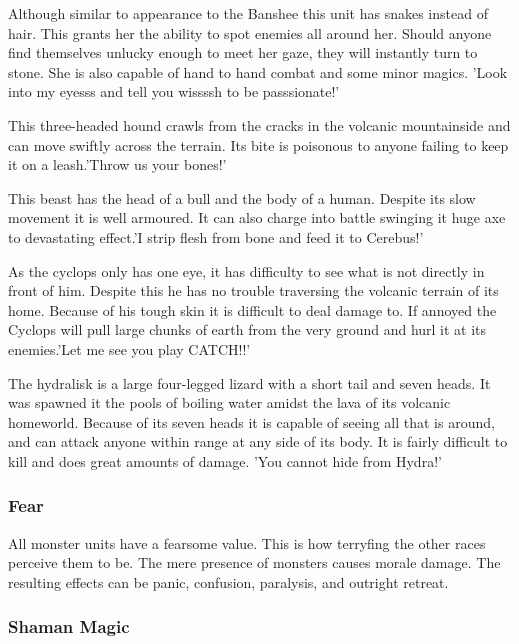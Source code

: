\documentclass[a4paper,twocolumn]{article}
\begin{document}
Although similar to appearance to the Banshee this unit has snakes instead of hair. This grants her the ability to spot enemies all around her. Should anyone find themselves unlucky enough to meet her gaze, they will instantly turn to stone. She is also capable of hand to hand combat and some minor magics. 'Look into my eyesss and tell you wissssh to be passsionate!'

This three-headed hound crawls from the cracks in the volcanic mountainside and can move swiftly across the terrain. Its bite is poisonous to anyone failing to keep it on a leash.'Throw us your bones!'

This beast has the head of a bull and the body of a human. Despite its slow movement it is well armoured. It can also charge into battle swinging it huge axe to devastating effect.'I strip flesh from bone and feed it to Cerebus!'

As the cyclops only has one eye, it has difficulty to see what is not directly in front of him. Despite this he has no trouble traversing the volcanic terrain of its home. Because of his tough skin it is difficult to deal damage to. If annoyed the Cyclops will pull large chunks of earth from the very ground and hurl it at its enemies.'Let me see you play CATCH!!'

The hydralisk is a large four-legged lizard with a short tail and seven heads. It was spawned it the pools of boiling water amidst the lava of its volcanic homeworld. Because of its seven heads it is capable of seeing all that is around, and can attack anyone within range at any side of its body. It is fairly difficult to kill and does great amounts of damage. 'You cannot hide from Hydra!'

\subsubsection{Fear}

All monster units have a fearsome value. This is how terryfing the other races perceive them to be. The mere presence of monsters causes morale damage. The resulting effects can be panic, confusion, paralysis, and outright retreat.

\subsubsection{Shaman Magic}
\end{document}
